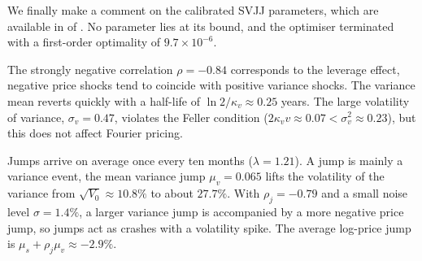 We finally make a comment on the calibrated SVJJ parameters, which are available in
 of . No parameter lies at its bound, and the
optimiser terminated with a first-order optimality of $9.7\times 10^{-6}$.

The strongly negative correlation $\rho=-0.84$ corresponds to the leverage effect, negative price
shocks tend to coincide with positive variance shocks. The variance mean reverts quickly with a
half-life of $\ln 2/\kappa_v\approx 0.25$ years. 
The large volatility of variance, $\sigma_v=0.47$, violates the Feller condition ($2\kappa_v
v\approx 0.07<\sigma_v^2\approx 0.23$), but this does not affect Fourier pricing.

Jumps arrive on average once every ten months ($\lambda=1.21$). A jump is mainly a variance event,
the mean variance jump $\mu_v=0.065$ lifts the volatility of the variance from $\sqrt{V_0}\approx
10.8\%$ to about $27.7\%$. 
With $\rho_j=-0.79$ and a small noise level $\sigma=1.4\%$, a larger variance jump is accompanied by
a more negative price jump, so jumps act as crashes with a volatility spike. The average log-price
jump is $\mu_s+\rho_j\mu_v\approx-2.9\%$. 




